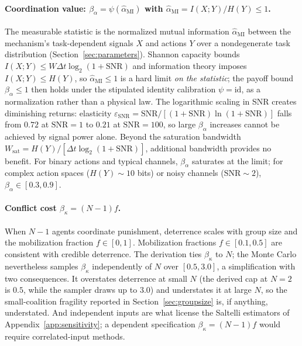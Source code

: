 \documentclass[manuscript,screen,review]{jair}
\begin{document}
\paragraph{Coordination value: $\beta_\alpha = \psi(\hat\alpha_{\mathrm{MI}})$ with $\hat\alpha_{\mathrm{MI}} = I(X;Y)/H(Y) \leq 1$.}
The measurable statistic is the normalized mutual information $\hat\alpha_{\mathrm{MI}}$ between the mechanism's task-dependent signals $X$ and actions $Y$ over a nondegenerate task distribution (Section~\ref{sec:parameters}). Shannon capacity bounds $I(X;Y) \leq W\Delta t\log_2(1+\mathrm{SNR})$ and information theory imposes $I(X;Y) \leq H(Y)$, so $\hat\alpha_{\mathrm{MI}} \leq 1$ is a hard limit \emph{on the statistic}; the payoff bound $\beta_\alpha \leq 1$ then holds under the stipulated identity calibration $\psi = \mathrm{id}$, as a normalization rather than a physical law. The logarithmic scaling in SNR creates diminishing returns: elasticity $\varepsilon_{\mathrm{SNR}} = \mathrm{SNR}/[(1+\mathrm{SNR})\ln(1+\mathrm{SNR})]$ falls from $0.72$ at $\mathrm{SNR}=1$ to $0.21$ at $\mathrm{SNR}=100$, so large $\beta_\alpha$ increases cannot be achieved by signal power alone. Beyond the saturation bandwidth $W_{\mathrm{sat}} = H(Y)/[\Delta t\log_2(1+\mathrm{SNR})]$, additional bandwidth provides no benefit. For binary actions and typical channels, $\beta_\alpha$ saturates at the limit; for complex action spaces ($H(Y)\sim 10$ bits) or noisy channels ($\mathrm{SNR}\sim 2$), $\beta_\alpha \in [0.3, 0.9]$.

\paragraph{Conflict cost $\beta_\kappa = (N-1)f$.}
When $N-1$ agents coordinate punishment, deterrence scales with group size and the mobilization fraction $f \in [0,1]$. Mobilization fractions $f \in [0.1, 0.5]$ are consistent with credible deterrence. The derivation ties $\beta_\kappa$ to $N$; the Monte Carlo nevertheless samples $\beta_\kappa$ independently of $N$ over $[0.5, 3.0]$, a simplification with two consequences. It overstates deterrence at small $N$ (the derived cap at $N=2$ is $0.5$, while the sampler draws up to $3.0$) and understates it at large $N$, so the small-coalition fragility reported in Section~\ref{sec:groupsize} is, if anything, understated. And independent inputs are what license the Saltelli estimators of Appendix~\ref{app:sensitivity}; a dependent specification $\beta_\kappa = (N-1)f$ would require correlated-input methods.
\end{document}
